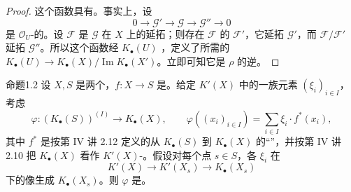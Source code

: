\begin{proof}
这个函数具有。事实上，设
\[
0\longrightarrow\mathcal G'\longrightarrow\mathcal G\longrightarrow\mathcal G''\longrightarrow0
\]
是 $\mathcal O_U$-的。设 $\mathcal F$ 是 $\mathcal G$ 在 $X$ 上的延拓；则存在 $\mathcal F$ 的 $\mathcal F'$，它延拓 $\mathcal G'$，而 $\mathcal F/\mathcal F'$ 延拓 $\mathcal G''$。所以这个函数经 $K_\bullet(U)$ ，定义了所需的 $K_\bullet(U)\to K_\bullet(X)/\operatorname{Im}K_\bullet(X')$。立即可知它是 $\rho$ 的逆。
\end{proof}

\begin{SGAresult}{命题}{1.2}
设 $X,S$ 是两个，$f:X\to S$ 是。给定 $K'(X)$ 中的一族元素 $(\xi_i)_{i\in I}$，考虑
\[
\varphi:(K_\bullet(S))^{(I)}\longrightarrow K_\bullet(X),\qquad
\varphi((x_i)_{i\in I})=\sum_{i\in I}\xi_i\cdot f^*(x_i),
\]
其中 $f^*$ 是按第 IV 讲 2.12 定义的从 $K_\bullet(S)$ 到 $K_\bullet(X)$ 的“”，并按第 IV 讲 2.10 把 $K_\bullet(X)$ 看作 $K'(X)$-。假设对每个点 $s\in S$，各 $\xi_i$ 在
\[
K'(X)\longrightarrow K'(X_s)\longrightarrow K_\bullet(X_s)
\]
下的像生成 $K_\bullet(X_s)$。则 $\varphi$ 是。
\end{SGAresult}

